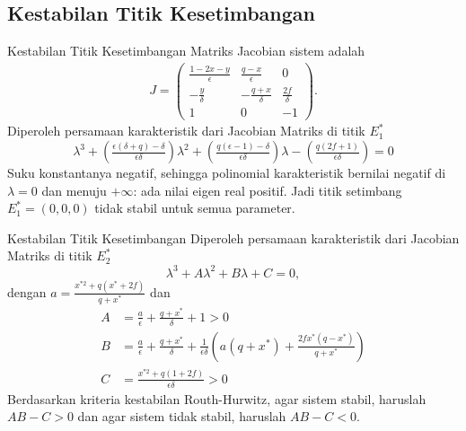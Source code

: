 \documentclass[aspectratio=169]{beamer}
\begin{document}
\subsection{Kestabilan Titik Kesetimbangan}

\begin{frame}{Kestabilan Titik Kesetimbangan}
    Matriks Jacobian sistem adalah
    \begin{align*}
        J = \begin{pmatrix}
            \frac{1-2x-y}{\epsilon} & \frac{q-x}{\epsilon} & 0 \\
            -\frac{y}{\delta} & -\frac{q+x}{\delta} & \frac{2f}{\delta} \\
            1 & 0 & -1
        \end{pmatrix}.
    \end{align*}
    Diperoleh persamaan karakteristik dari Jacobian Matriks di titik $E_1^{*}$
    \begin{equation*}
        \lambda^3 + \left( \tfrac{\epsilon(\delta+q)-\delta}{\epsilon \delta} \right)\lambda^2 + \left( \tfrac{q(\epsilon-1)-\delta}{\epsilon \delta}\right)\lambda-\left( \tfrac{q(2f+1)}{\epsilon \delta}\right)=0
    \end{equation*}
    Suku konstantanya negatif, sehingga polinomial karakteristik bernilai negatif di $\lambda = 0$ dan menuju $+\infty$:
    ada nilai eigen real positif. Jadi titik setimbang $E_1^*=(0,0,0)$ tidak stabil untuk semua parameter.
\end{frame}

\begin{frame}{Kestabilan Titik Kesetimbangan}
    Diperoleh persamaan karakteristik dari Jacobian Matriks di titik $E_2^{*}$
    \begin{equation*}
        \lambda^3 + A\lambda^2 + B\lambda+C=0,
    \end{equation*}
    dengan $a = \tfrac{x^{*2}+q(x^*+2f)}{q+x^*}$ dan
    \begin{align*}
        A &= \tfrac{a}{\epsilon}+\tfrac{q+x^*}{\delta}+1 > 0 \\
        B &= \tfrac{a}{\epsilon}+\tfrac{q+x^*}{\delta}+\tfrac{1}{\epsilon\delta}\left(a(q+x^*)+\tfrac{2fx^*(q-x^*)}{q+x^*} \right) \\
        C &= \tfrac{x^{*2}+q(1+2f)}{\epsilon \delta} > 0
    \end{align*}
    Berdasarkan kriteria kestabilan Routh-Hurwitz, agar sistem stabil, haruslah $AB - C > 0$ dan agar sistem tidak stabil, haruslah $AB - C < 0$.
\end{frame}
\end{document}
